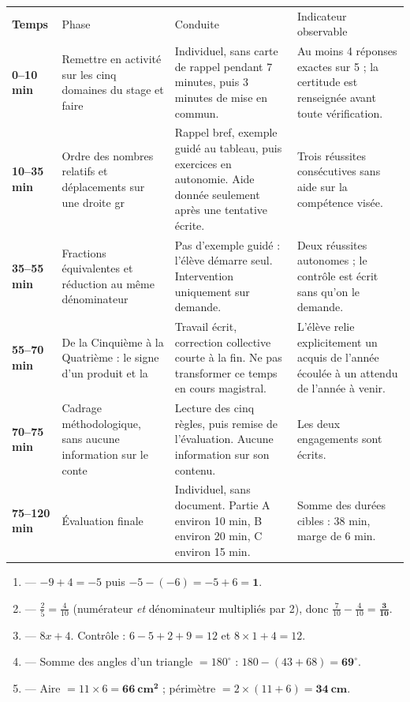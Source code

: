 \documentclass[10pt,a4paper]{article}
\begin{document}
\par\noindent\begin{tabularx}{\linewidth}{>{\bfseries}p{18mm} p{34mm} X X}
\rowcolor{Navy}\color{white}Temps & \color{white}Phase & \color{white}Conduite & \color{white}Indicateur observable \\
0--10 min & Remettre en activité sur les cinq domaines du stage et faire & Individuel, sans carte de rappel pendant 7 minutes, puis 3 minutes de mise en commun. & Au moins 4 réponses exactes sur 5 ; la certitude est renseignée avant toute vérification. \\
10--35 min & Ordre des nombres relatifs et déplacements sur une droite gr & Rappel bref, exemple guidé au tableau, puis exercices en autonomie. Aide donnée seulement après une tentative écrite. & Trois réussites consécutives sans aide sur la compétence visée. \\
35--55 min & Fractions équivalentes et réduction au même dénominateur & Pas d'exemple guidé : l'élève démarre seul. Intervention uniquement sur demande. & Deux réussites autonomes ; le contrôle est écrit sans qu'on le demande. \\
55--70 min & De la Cinquième à la Quatrième : le signe d'un produit et la & Travail écrit, correction collective courte à la fin. Ne pas transformer ce temps en cours magistral. & L'élève relie explicitement un acquis de l'année écoulée à un attendu de l'année à venir. \\
70--75 min & Cadrage méthodologique, sans aucune information sur le conte & Lecture des cinq règles, puis remise de l'évaluation. Aucune information sur son contenu. & Les deux engagements sont écrits. \\
75--120 min & Évaluation finale & Individuel, sans document. Partie A environ 10 min, B environ 20 min, C environ 15 min. & Somme des durées cibles : 38 min, marge de 6 min. \\
\end{tabularx}
\newpage{}
\begin{enumerate}
\item {} --- $-9+4=-5$ puis $-5-(-6)=-5+6=\mathbf{1}$.
\item {} --- $\frac{2}{5}=\frac{4}{10}$ (numérateur \emph{et} dénominateur multipliés par 2), donc $\frac{7}{10}-\frac{4}{10}=\mathbf{\frac{3}{10}}$.
\item {} --- $8x+4$. Contrôle : $6-5+2+9=12$ et $8\times 1+4=12$.
\item {} --- Somme des angles d'un triangle $=180^\circ$ : $180-(43+68)=\mathbf{69^\circ}$.
\item {} --- Aire $=11\times 6=\mathbf{66\ \text{cm}^2}$ ; périmètre $=2\times(11+6)=\mathbf{34\ \text{cm}}$.
\end{enumerate}
\end{document}
